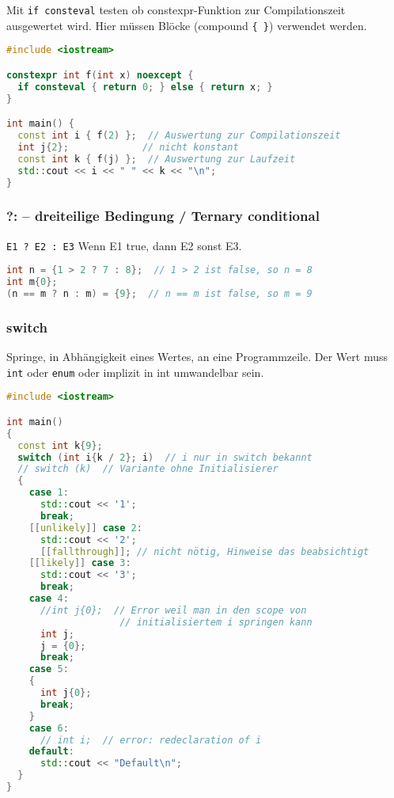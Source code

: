 \documentclass[10pt,twocolumn]{scrartcl}
\begin{document}
Mit \lstinline|if consteval| testen ob constexpr-Funktion zur Compilationszeit
ausgewertet wird. Hier müssen Blöcke (compound \lstinline|{ }|) verwendet
werden.

\begin{lstlisting}[language=C++]
#include <iostream>

constexpr int f(int x) noexcept {
  if consteval { return 0; } else { return x; }
}

int main() {
  const int i { f(2) };  // Auswertung zur Compilationszeit
  int j{2};             // nicht konstant
  const int k { f(j) };  // Auswertung zur Laufzeit
  std::cout << i << " " << k << "\n";
}
\end{lstlisting}

\subsubsection{?: -- dreiteilige Bedingung / Ternary conditional}

\lstinline|E1 ? E2 : E3| Wenn E1 true, dann E2 sonst E3.

\begin{lstlisting}[language=C++]
int n = {1 > 2 ? 7 : 8};  // 1 > 2 ist false, so n = 8
int m{0};
(n == m ? n : m) = {9};  // n == m ist false, so m = 9
\end{lstlisting}

\subsubsection{switch}

Springe, in Abhängigkeit eines Wertes, an eine Programmzeile. Der Wert muss
\lstinline|int| oder \lstinline|enum| oder implizit in int umwandelbar
sein.

\begin{lstlisting}[language=C++]
#include <iostream>

int main()
{
  const int k{9};
  switch (int i{k / 2}; i)  // i nur in switch bekannt
  // switch (k)  // Variante ohne Initialisierer
  {
    case 1:
      std::cout << '1';
      break;
    [[unlikely]] case 2:
      std::cout << '2';
      [[fallthrough]]; // nicht nötig, Hinweise das beabsichtigt
    [[likely]] case 3:
      std::cout << '3';
      break;
    case 4:
      //int j{0};  // Error weil man in den scope von
                    // initialisiertem i springen kann
      int j;
      j = {0};
      break;
    case 5:
    {
      int j{0};
      break;
    }
    case 6:
      // int i;  // error: redeclaration of i
    default:
      std::cout << "Default\n";
  }
}
\end{lstlisting}
\end{document}
